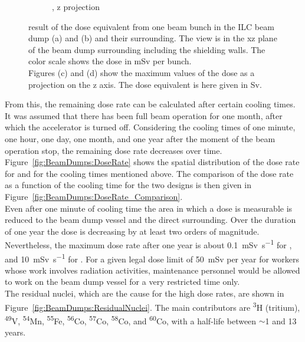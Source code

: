 \begin{figure}[h]
\begin{subfigure}[b]{0.485\textwidth}
   \caption{\designtwo, z projection}
   \end{subfigure}
   \caption[Dose equivalent in the ILC main beam dump]{\fluka result of the dose equivalent from one beam bunch in the ILC beam dump \designone (a) and \designtwo (b) and their surrounding.
   The view is in the xz plane of the beam dump surrounding including the shielding walls.
   The color scale shows the dose in \si{\milli\sievert} per bunch.
   \\Figures (c) and (d) show the maximum values of the dose as a projection on the z axis.
   The dose equivalent is here given in \si{\sievert}.}
   \label{fig:BeamDumps:Dose}
\end{figure}

From this, the remaining dose rate can be calculated after certain cooling times.
It was assumed that there has been full beam operation for one month, after which the accelerator is turned off.
Considering the cooling times of one minute, one hour, one day, one month, and one year after the moment of the beam operation stop, the remaining dose rate decreases over time.
Figure~\ref{fig:BeamDumps:DoseRate} shows the spatial distribution of the dose rate for \designone and \designtwo for the cooling times mentioned above.
The comparison of the dose rate as a function of the cooling time for the two designs is then given in Figure~\ref{fig:BeamDumps:DoseRate_Comparison}.
\\Even after one minute of cooling time the area in which a dose is measurable is reduced to the beam dump vessel and the direct surrounding.
Over the duration of one year the dose is decreasing by at least two orders of magnitude.
Nevertheless, the maximum dose rate after one year is about \SI{0.1}{\milli\sievert\per\second} for \designone, and \SI{10}{\milli\sievert\per\second} for \designtwo.
For a given legal dose limit of \SI{50}{\milli\sievert} per year for workers whose work involves radiation activities, maintenance personnel would be allowed to work on the beam dump vessel for a very restricted time only.
\\The residual nuclei, which are the cause for the high dose rates, are shown in Figure~\ref{fig:BeamDumps:ResidualNuclei}.
The main contributors are \textsuperscript{3}H (tritium), \textsuperscript{49}V, \textsuperscript{54}Mn, \textsuperscript{55}Fe, \textsuperscript{56}Co, \textsuperscript{57}Co, \textsuperscript{58}Co, and \textsuperscript{60}Co, with a half-life between $\sim$1 and 13 years.

